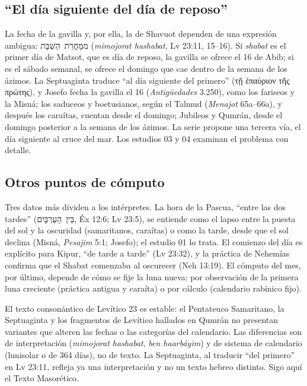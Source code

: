 \documentclass[11pt,letterpaper]{article}
\newcommand{\heb}[1]{\mbox{\foreignlanguage{hebrew}{#1}}}
\newcommand{\grc}[1]{\foreignlanguage{ancientgreek}{#1}}
\begin{document}
\subsection{``El día siguiente del día de reposo''}
La fecha de la gavilla y, por ella, la de Shavuot dependen de una expresión ambigua: \heb{מִמָּחֳרַת הַשַּׁבָּת} (\emph{mimojorat hashabat}, Lv 23:11, 15--16). Si \emph{shabat} es el primer día de Matsot, que es día de reposo, la gavilla se ofrece el 16 de Abib; si es el sábado semanal, se ofrece el domingo que cae dentro de la semana de los ázimos. La Septuaginta traduce ``al día siguiente del primero'' (\grc{τῇ ἐπαύριον τῆς πρώτης}), y Josefo fecha la gavilla el 16 (\emph{Antigüedades} 3.250), como los fariseos y la Misná; los saduceos y boetusianos, según el Talmud (\emph{Menajot} 65a--66a), y después los caraítas, cuentan desde el domingo; Jubileos y Qumrán, desde el domingo posterior a la semana de los ázimos. La serie propone una tercera vía, el día siguiente al cruce del mar. Los estudios 03 y 04 examinan el problema con detalle.

\subsection{Otros puntos de cómputo}
Tres datos más dividen a los intérpretes. La hora de la Pascua, ``entre las dos tardes'' (\heb{בֵּין הָעַרְבָּיִם}, Éx 12:6; Lv 23:5), se entiende como el lapso entre la puesta del sol y la oscuridad (samaritanos, caraítas) o como la tarde, desde que el sol declina (Misná, \emph{Pesajim} 5:1; Josefo); el estudio 01 lo trata. El comienzo del día es explícito para Kipur, ``de tarde a tarde'' (Lv 23:32), y la práctica de Nehemías confirma que el Shabat comenzaba al oscurecer (Neh 13:19). El cómputo del mes, por último, depende de cómo se fije la luna nueva: por observación de la primera luna creciente (práctica antigua y caraíta) o por cálculo (calendario rabínico fijo).

\begin{nota}
El texto consonántico de Levítico 23 es estable: el Pentateuco Samaritano, la Septuaginta y los fragmentos de Levítico hallados en Qumrán no presentan variantes que alteren las fechas o las categorías del calendario. Las diferencias son de interpretación (\emph{mimojorat hashabat}, \emph{ben haarbáyim}) y de sistema de calendario (lunisolar o de 364 días), no de texto. La Septuaginta, al traducir ``del primero'' en Lv 23:11, refleja ya una interpretación y no un texto hebreo distinto. Sigo aquí el Texto Masorético.
\end{nota}
\end{document}
